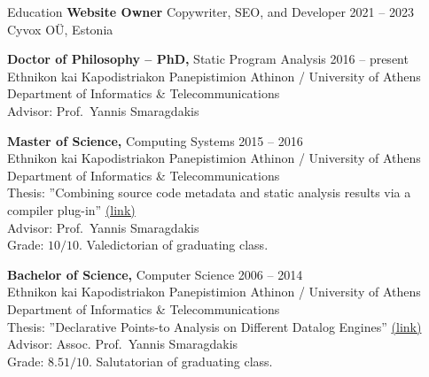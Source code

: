 \documentclass{resume}
\begin{document}
\newcommand{\mytilde}{\raise.17ex\hbox{$\scriptstyle\mathtt{\sim}$}}
\newcommand{\indentitem}{\setlength\itemindent{25pt}}


\begin{rSection}{Education}
  {\bf Website Owner} Copywriter, SEO, and Developer \hfill {2021 -- 2023 } \\
  Cyvox OÜ, Estonia

  {\bf Doctor of Philosophy -- PhD,} Static Program Analysis \hfill {2016 -- present } \\
  Ethnikon kai Kapodistriakon Panepistimion Athinon / University of Athens \\
  Department of Informatics \& Telecommunications \\
  Advisor: Prof.~Yannis Smaragdakis

  {\bf Master of Science,} Computing Systems \hfill {2015 -- 2016 } \\
  Ethnikon kai Kapodistriakon Panepistimion Athinon / University of Athens \\
  Department of Informatics \& Telecommunications \\
  Thesis: ''Combining source code metadata and static analysis results via a compiler plug-in'' \href{http://cgi.di.uoa.gr/~smaragd/theses/antoniadis2.pdf}{ (link)} \\
  Advisor: Prof.~Yannis Smaragdakis \\
  Grade: $10 / 10$. Valedictorian of graduating class.

  {\bf Bachelor of Science,}  Computer Science \hfill {2006 -- 2014}  \\
  Ethnikon kai Kapodistriakon Panepistimion Athinon / University of Athens \\
  Department of Informatics \& Telecommunications \\
  Thesis: ''Declarative Points-to Analysis on Different Datalog Engines'' \href{http://cgi.di.uoa.gr/~smaragd/theses/antoniadis.pdf}{ (link)} \\
  Advisor: Assoc. Prof.~Yannis Smaragdakis \\
  Grade: $8.51 / 10$. Salutatorian of graduating class.

\end{rSection}

\end{document}
